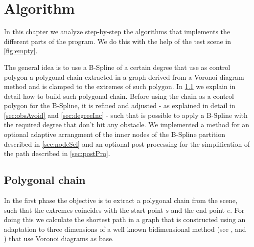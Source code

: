 \documentclass[dissertation.tex]{subfiles}
\begin{document}
\chapter{Algorithm}
In this chapter we analyze step-by-step the algorithms that implements
the different parts of the program. We do this with the help of the
test scene in \cref{fig:empty}.

The general idea is to use a B-Spline of a certain degree that use as
control polygon a polygonal chain extracted in a graph
derived from a Voronoi diagram method and is clamped to the extremes
of such polygon. In \cref{sec:polChain} we explain in detail how to
build such polygonal chain. Before using the chain as a control
polygon for the B-Spline, it is refined and adjusted - as explained in
detail in \cref{sec:obsAvoid} and \cref{sec:degreeInc} - such that is
possible to apply a B-Spline with the required degree that don't hit
any obstacle. We implemented a method for an optional adaptive
arrangment of the inner nodes of the B-Spline partition described in
\cref{sec:nodeSel} and an optional post processing for the
simplification of the path described in \cref{sec:postPro}.
\section{Polygonal chain}\label{sec:polChain}
In the first phase the objective is to extract a polygonal chain from
the scene, such that the extremes coincides with the start point $s$
and the end point $e$. For doing this we calculate the shortest path
in a graph that is constructed using an adaptation to three
dimensions of a well known bidimensional method (see
\cite{bhattacharya}, \cite{ho-liu} and \cite{seda-pich}) that use
Voronoi diagrams as base.
\end{document}
